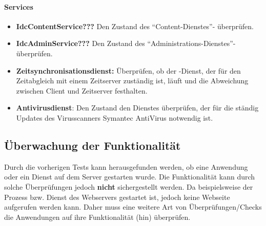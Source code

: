 \paragraph{Services}
\begin{itemize}
\item \textbf{IdcContentService???}  Den Zustand des "`Content-Dienstes"'- überprüfen.
\item \textbf{IdcAdminService???}  Den Zustand des "`Administrations-Dienstes"'- überprüfen.
\item \textbf{Zeitsynchronisationsdienst:} Überprüfen, ob der -Dienst, der für den Zeitabgleich mit einem Zeitserver zuständig ist, läuft und die Abweichung zwischen Client und Zeitserver festhalten.
\item \textbf{Antivirusdienst}: Den Zustand den Dienstes überprüfen, der für die ständig Updates des Virusscanners Symantec AntiVirus notwendig ist.
\end{itemize}

\subsection{Überwachung der Funktionalität}
Durch die vorherigen Tests kann herausgefunden werden, ob eine Anwendung oder ein Dienst auf dem Server gestarten wurde.
Die Funktionalität kann durch solche Überprüfungen jedoch \textbf{nicht} sichergestellt werden.
Da beispielsweise der Prozess bzw. Dienst des Webservers gestartet ist, jedoch keine Webseite aufgerufen werden kann.
Daher muss eine weitere Art von Überprüfungen/Checks die Anwendungen auf ihre Funktionalität (hin) überprüfen.

